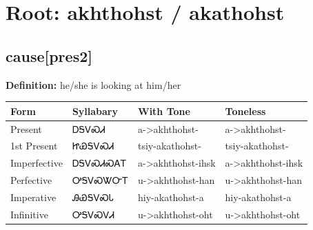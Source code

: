 \documentclass{article}%
\begin{document}
%
\normalsize%
\section*{Root: akhthohst / akathohst}%
\subsection*{cause[pres2]}%
\textbf{Definition: }%
he/she is looking at him/her%
\\[0.5em]%
\begin{tabular}{|l|l|l|l|}%
\hline%
\textbf{Form}&\textbf{Syllabary}&\textbf{With Tone}&\textbf{Toneless}\\%
\hline%
Present&ᎠᎦᏙᏍᏗ&a{-}>akhthohst{-}&a{-}>akhthohst{-}\\%
1st Present&ᏥᏯᎦᏙᏍᏗ&tsiy{-}akathohst{-}&tsiy{-}akathohst{-}\\%
Imperfective&ᎠᎦᏙᏍᏗᏍᎪᎢ&a{-}>akhthohst{-}ihsk&a{-}>akhthohst{-}ihsk\\%
Perfective&ᎤᎦᏙᏍᏔᏅᎢ&u{-}>akhthohst{-}han&u{-}>akhthohst{-}han\\%
Imperative&ᎯᏯᎦᏙᏍᏓ&hiy{-}akathohst{-}a&hiy{-}akathohst{-}a\\%
Infinitive&ᎤᎦᏙᏍᏙᏗ&u{-}>akhthohst{-}oht&u{-}>akhthohst{-}oht\\%
\hline%
\end{tabular}%
\\[1em]%
\end{document}
